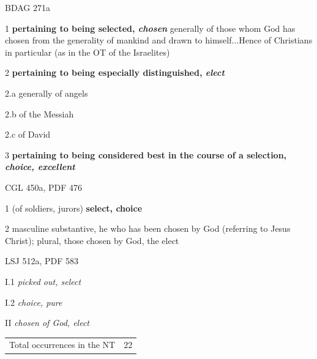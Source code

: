 				\begin{compactdesc}
					\item[BDAG 271a] \textbf{}
						\begin{compactitem}
							\item[1] \textbf{pertaining to being selected, \textit{chosen}} generally of those whom God has chosen from the generality of mankind and drawn to himself...Hence of Christians in particular (as in the OT of the Israelites)
							\item[2] \textbf{pertaining to being especially distinguished, \textit{elect}}
							\item[2.a] generally of angels
							\item[2.b] of the Messiah
							\item[2.c] of David
							\item[3] \textbf{pertaining to being considered best in the course of a selection, \textit{choice, excellent}}
						\end{compactitem}
					\item[CGL 450a, PDF 476] \textbf{}
						\begin{compactitem}
							\item[1] (of soldiers, jurors) \textbf{select, choice}
							\item[2] masculine substantive, he who has been chosen by God (referring to Jesus Christ); plural, those chosen by God, the elect
						\end{compactitem}
					\item[LSJ 512a, PDF 583] \textbf{}
						\begin{compactitem}
							\item[I.1] \textit{picked out, select}
							\item[I.2] \textit{choice, pure}
							\item[II] \textit{chosen of God, elect}
						\end{compactitem}
				\end{compactdesc}
				
				\begin{tabular}{ll}
					Total occurrences in the NT & 22
				\end{tabular}
				
